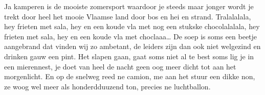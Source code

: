
\beginverse
Ja kamperen is de mooiste zomersport
waardoor je steeds maar jonger wordt
je trekt door heel het mooie Vlaamse land
door bos en hei en strand.
\endverse
\beginchorus
Tralalalala, hey frieten met sala, hey
en een koude vla met nog een stukske
chocolalalala, hey frieten met sala, hey
en een koude vla met choclaaa…
\endchorus
\beginverse
De soep is soms een beetje aangebrand
dat vinden wij zo ambetant, 
de leiders zijn dan ook niet welgezind
en drinken gauw een pint.
\endverse
\beginverse
Het slapen gaan, gaat soms niet al te best
soms lig je in een mierennest,
je doet van heel de nacht geen oog meer dicht
tot aan het morgenlicht.
\endverse
\beginverse
En op de snelweg reed ne camion,
me aan het stuur een dikke non,
ze woog wel meer als honderdduuzend ton,
precies ne luchtballon.
\endverse
\endsong